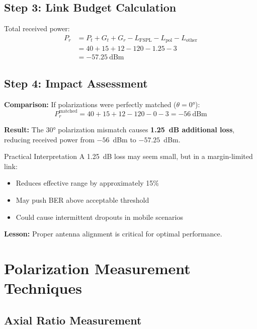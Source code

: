 \subsection*{Step 3: Link Budget Calculation}

Total received power:
\begin{align}
P_r &= P_t + G_t + G_r - L_{\text{FSPL}} - L_{\text{pol}} - L_{\text{other}} \\
&= 40 + 15 + 12 - 120 - 1.25 - 3 \\
&= -57.25~\text{dBm}
\end{align}

\subsection*{Step 4: Impact Assessment}

\textbf{Comparison:} If polarizations were perfectly matched ($\theta = 0°$):
\begin{equation}
P_r^{\text{matched}} = 40 + 15 + 12 - 120 - 0 - 3 = -56~\text{dBm}
\end{equation}

\textbf{Result:} The $30°$ polarization mismatch causes \textbf{1.25~dB additional loss}, reducing received power from $-56$~dBm to $-57.25$~dBm.

\begin{calloutbox}[colback=black!8!white,colframe=black]{Practical Interpretation}
A 1.25~dB loss may seem small, but in a margin-limited link:
\begin{itemize}
\item Reduces effective range by approximately 15\%
\item May push BER above acceptable threshold
\item Could cause intermittent dropouts in mobile scenarios
\end{itemize}

\textbf{Lesson:} Proper antenna alignment is critical for optimal performance.
\end{calloutbox}

\section{Polarization Measurement Techniques}

\subsection{Axial Ratio Measurement}

